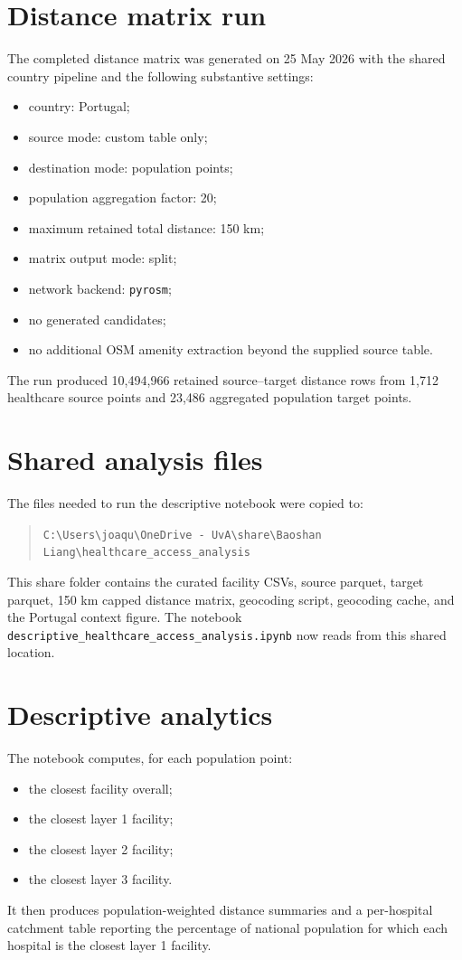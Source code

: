 \documentclass[11pt]{article}
\begin{document}
\section*{Distance matrix run}
The completed distance matrix was generated on 25 May 2026 with the shared country pipeline and the following substantive settings:
\begin{itemize}[leftmargin=*]
  \item country: Portugal;
  \item source mode: custom table only;
  \item destination mode: population points;
  \item population aggregation factor: 20;
  \item maximum retained total distance: 150 km;
  \item matrix output mode: split;
  \item network backend: \texttt{pyrosm};
  \item no generated candidates;
  \item no additional OSM amenity extraction beyond the supplied source table.
\end{itemize}
The run produced 10,494,966 retained source--target distance rows from 1,712 healthcare source points and 23,486 aggregated population target points.

\section*{Shared analysis files}
The files needed to run the descriptive notebook were copied to:
\begin{quote}
\texttt{C:\textbackslash Users\textbackslash joaqu\textbackslash OneDrive - UvA\textbackslash share\textbackslash Baoshan Liang\textbackslash healthcare\_access\_analysis}
\end{quote}
This share folder contains the curated facility CSVs, source parquet, target parquet, 150 km capped distance matrix, geocoding script, geocoding cache, and the Portugal context figure. The notebook \texttt{descriptive\_healthcare\_access\_analysis.ipynb} now reads from this shared location.

\section*{Descriptive analytics}
The notebook computes, for each population point:
\begin{itemize}[leftmargin=*]
  \item the closest facility overall;
  \item the closest layer 1 facility;
  \item the closest layer 2 facility;
  \item the closest layer 3 facility.
\end{itemize}
It then produces population-weighted distance summaries and a per-hospital catchment table reporting the percentage of national population for which each hospital is the closest layer 1 facility.
\end{document}
